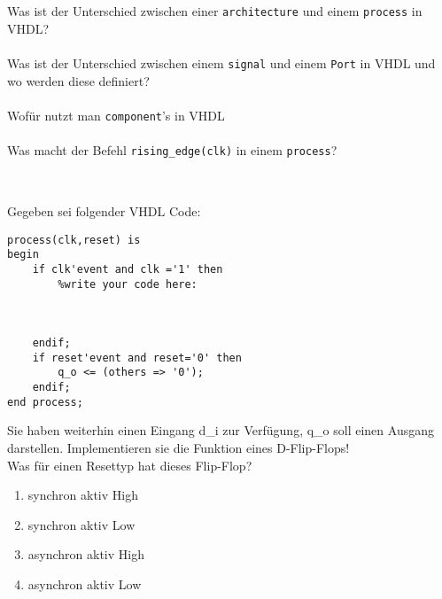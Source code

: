 \subsection{}
Was ist der Unterschied zwischen einer \texttt{architecture} und einem \texttt{process} in VHDL?\\
\\[0.3cm]
Was ist der Unterschied zwischen einem \texttt{signal} und einem \texttt{Port} in VHDL und wo werden diese definiert?\\
\\[0.3cm]
Wofür nutzt man \texttt{component}'s in VHDL\\
\\[0.3cm]
Was macht der Befehl \texttt{rising_edge(clk)} in einem \texttt{process}?\\
\\[0.3cm]
\newpage
\subsection{}
Gegeben sei folgender VHDL Code:
\begin{verbatim}
process(clk,reset) is
begin
	if clk'event and clk ='1' then
		%write your code here:
		
		
		
	endif;
	if reset'event and reset='0' then
		q_o <= (others => '0');
	endif;
end process;
\end{verbatim}
Sie haben weiterhin einen Eingang d\_i zur Verfügung, q\_o soll einen Ausgang darstellen.
Implementieren sie die Funktion eines D-Flip-Flops!\\
Was für einen Resettyp hat dieses Flip-Flop?\\
\begin{enumerate}
	\item synchron aktiv High\hfill{}\hspace*{11.5cm}\\
	\item synchron aktiv Low\hfill{}\hspace*{11.5cm}\\
	\item asynchron aktiv High\hfill{}\hspace*{11.5cm}\\
	\item asynchron aktiv Low\hfill{}\hspace*{11.5cm}\\
\end{enumerate}